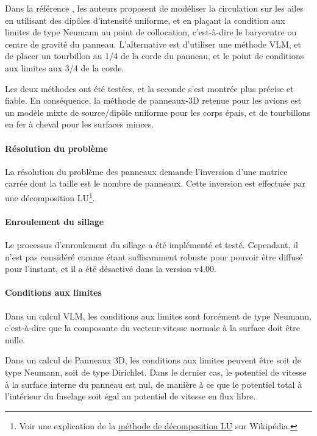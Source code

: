 \documentclass[a4paper,twoside,12pt,dvips]{article}
\begin{document}
Dans la référence \cite{Maskew}, les auteurs proposent de modéliser la circulation sur les ailes en utilisant des dipôles d’intensité uniforme, et en plaçant la condition aux limites de type Neumann au point de collocation, c’est-à-dire le barycentre ou centre de gravité du panneau. L’alternative est d’utiliser une méthode VLM, et de placer un tourbillon au 1/4 de la corde du panneau, et le point de conditions aux limites aux 3/4 de la corde.

Les deux méthodes ont été testées, et la seconde s’est montrée plus précise et fiable. En conséquence, la méthode de panneaux-3D retenue pour les avions est un modèle mixte de source/dipôle uniforme pour les corps épais, et de tourbillons en fer à cheval pour les surfaces minces.

\paragraph{Résolution du problème}

La résolution du problème des panneaux demande l’inversion d’une matrice carrée dont la taille est le nombre de panneaux. Cette inversion est effectuée par une décomposition LU\footnote{Voir une explication de la 
\href{https://fr.wikipedia.org/wiki/Décomposition_LU}{méthode de décomposition LU} sur Wikipédia.}.

\paragraph{Enroulement du sillage}

Le processus d’enroulement du sillage a été implémenté et testé. Cependant, il n’est pas considéré comme étant suffisamment robuste pour pouvoir être diffusé pour l’instant, et il a été désactivé dans la version v4.00.

\paragraph{Conditions aux limites}

Dans un calcul VLM, les conditions aux limites sont forcément de type Neumann, c’est-à-dire que la composante du vecteur-vitesse normale à la surface doit être nulle. 

Dans un calcul de Panneaux 3D, les conditions aux limites peuvent être soit 
de type Neumann, soit de type Dirichlet. Dans le dernier cas, le potentiel de 
vitesse à la surface interne du panneau est nul, de manière à ce que le potentiel total à l’intérieur du fuselage soit égal au potentiel de vitesse en flux libre.
\end{document}
